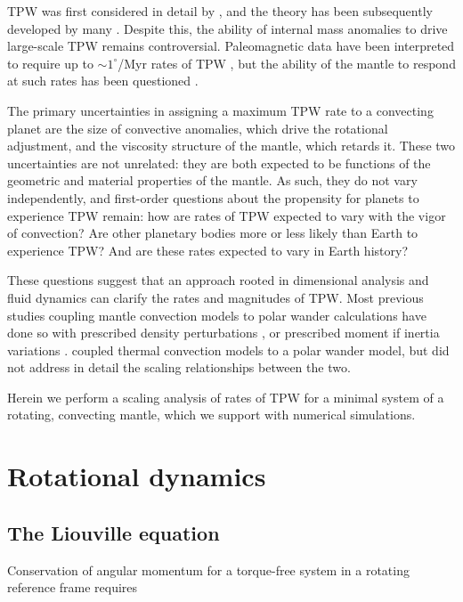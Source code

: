\documentclass[extra,mreferee]{gji}
\begin{document}
TPW was first considered in detail by \citet{darwin1887influence}, and the theory has been subsequently developed by many \citep[e.g.][]{munk1960rotation, goldreich1969some, ricard1993polar}. 
Despite this, the ability of internal mass anomalies to drive large-scale TPW remains controversial. 
Paleomagnetic data have been interpreted to require up to $\sim 1^\circ$/Myr rates of TPW \citep{mitchell2011sutton}, but the ability of the mantle to respond at such rates has been questioned \citep{tsai2007theoretical}.

The primary uncertainties in assigning a maximum TPW rate to a convecting planet are the size of convective anomalies, which drive the rotational adjustment, and the viscosity structure of the mantle, which retards it. 
These two uncertainties are not unrelated: they are both expected to be functions of the geometric and material properties of the mantle.
As such, they do not vary independently, and first-order questions about the propensity for planets to experience TPW remain: how are rates of TPW expected to vary with the vigor of convection? 
Are other planetary bodies more or less likely than Earth to experience TPW?  And are these rates expected to vary in Earth history?

These questions suggest that an approach rooted in dimensional analysis and fluid dynamics can clarify the rates and magnitudes of TPW.
Most previous studies coupling mantle convection models to polar wander calculations have done so with prescribed density perturbations \citep[e.g.][]{greff2004upwelling}, or prescribed moment if inertia variations \citep[e.g.][]{tsai2007theoretical, creveling2012mechanisms}. 
\citet{richards1999polar} coupled thermal convection models to a polar wander model, but did not address in detail the scaling relationships between the two.

Herein we perform a scaling analysis of rates of TPW for a minimal system of a rotating, convecting mantle,  which we support with numerical simulations.

\section{Rotational dynamics}

\subsection{The Liouville equation}
Conservation of angular momentum for a torque-free system in a rotating reference frame requires
\end{document}
